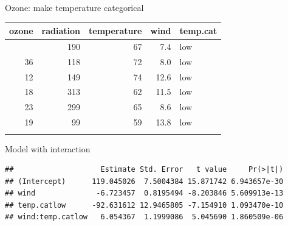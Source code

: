 \documentclass[
  ignorenonframetext,
]{beamer}
\newenvironment{Shaded}{\begin{snugshade}}{\end{snugshade}}
\newcommand{\AttributeTok}[1]{\textcolor[rgb]{0.13,0.29,0.53}{#1}}
\newcommand{\FunctionTok}[1]{\textcolor[rgb]{0.13,0.29,0.53}{\textbf{#1}}}
\newcommand{\NormalTok}[1]{#1}
\newcommand{\OtherTok}[1]{\textcolor[rgb]{0.56,0.35,0.01}{#1}}
\newcommand{\SpecialCharTok}[1]{\textcolor[rgb]{0.81,0.36,0.00}{\textbf{#1}}}
\newcommand{\StringTok}[1]{\textcolor[rgb]{0.31,0.60,0.02}{#1}}
\begin{document}
\begin{frame}[fragile]{Ozone: make temperature categorical}
\label{ozone-make-temperature-categorical}
\begin{Shaded}
\end{Shaded}

\begin{longtable}[]{@{}rrrrl@{}}
\toprule\noalign{}
ozone & radiation & temperature & wind & temp.cat \\
\midrule\noalign{}
\endhead
41 & 190 & 67 & 7.4 & low \\
36 & 118 & 72 & 8.0 & low \\
12 & 149 & 74 & 12.6 & low \\
18 & 313 & 62 & 11.5 & low \\
23 & 299 & 65 & 8.6 & low \\
19 & 99 & 59 & 13.8 & low \\
\bottomrule\noalign{}
\end{longtable}
\end{frame}

\begin{frame}[fragile]{Model with interaction}
\label{model-with-interaction}
\begin{Shaded}
\end{Shaded}

\begin{verbatim}
##                    Estimate Std. Error   t value     Pr(>|t|)
## (Intercept)      119.045026  7.5004384 15.871742 6.943657e-30
## wind              -6.723457  0.8195494 -8.203846 5.609913e-13
## temp.catlow      -92.631612 12.9465805 -7.154910 1.093470e-10
## wind:temp.catlow   6.054367  1.1999086  5.045690 1.860509e-06
\end{verbatim}
\end{frame}
\end{document}
